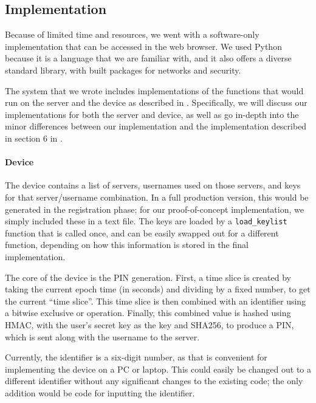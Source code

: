 \documentclass[11pt]{article} %
\begin{document}
\subsection{Implementation}

Because of limited time and resources, we went with a software-only
implementation that can be accessed in the web browser. We used Python
because it is a language that we are familiar with, and it also offers a
diverse standard library, with built packages for networks and security.

The system that we wrote includes implementations of the functions that
would run on the server and the device as described in
\cite{shirvanian2d2fa}. Specifically, we will discuss our
implementations for both the server and device, as well as go in-depth
into the minor differences between our implementation and the
implementation described in section 6 in \cite{shirvanian2d2fa}.

\paragraph{Device}

The device contains a list of servers, usernames used on those servers,
and keys for that server/username combination. In a full production
version, this would be generated in the registration phase; for our
proof-of-concept implementation, we simply included these in a text
file. The keys are loaded by a \texttt{load\_keylist} function that is
called once, and can be easily swapped out for a different function,
depending on how this information is stored in the final implementation.

The core of the device is the PIN generation. First, a time slice is
created by taking the current epoch time (in seconds) and dividing by a
fixed number, to get the current ``time slice''. This time slice is then
combined with an identifier using a bitwise exclusive or operation.
Finally, this combined value is hashed using HMAC, with the user's
secret key as the key and SHA256, to produce a PIN, which is sent along
with the username to the server.

Currently, the identifier is a six-digit number, as that is convenient
for implementing the device on a PC or laptop. This could easily be
changed out to a different identifier without any significant changes to
the existing code; the only addition would be code for inputting the
identifier.
\end{document}
